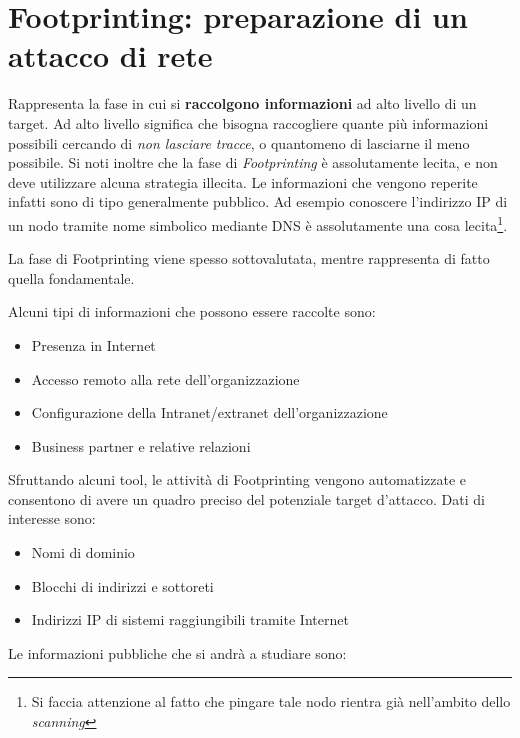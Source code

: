 \documentclass[14pt]{extreport}
\begin{document}
\chapter{Footprinting: preparazione di un attacco di rete}
Rappresenta la fase in cui si \textbf{raccolgono informazioni} ad alto livello di un target. Ad alto livello significa che bisogna raccogliere quante più informazioni possibili cercando di \textit{non lasciare tracce}, o quantomeno di lasciarne il meno possibile.
Si noti inoltre che la fase di \textit{Footprinting} è assolutamente lecita, e non deve utilizzare alcuna strategia illecita. Le informazioni che vengono reperite infatti sono di tipo generalmente pubblico. Ad esempio conoscere l'indirizzo IP di un nodo tramite nome simbolico mediante DNS è assolutamente una cosa lecita\footnote{Si faccia attenzione al fatto che pingare tale nodo rientra già nell'ambito dello \textit{scanning}}.

La fase di Footprinting viene spesso sottovalutata, mentre rappresenta di fatto quella fondamentale.

Alcuni tipi di informazioni che possono essere raccolte sono:

\begin{itemize}
    \item Presenza in Internet
    \item Accesso remoto alla rete dell'organizzazione
    \item Configurazione della Intranet/extranet dell'organizzazione
    \item Business partner e relative relazioni
\end{itemize}
Sfruttando alcuni tool, le attività di Footprinting vengono automatizzate e consentono di avere un quadro preciso del potenziale target d'attacco. Dati di interesse sono:

\begin{itemize}
    \item Nomi di dominio
    \item Blocchi di indirizzi e sottoreti
    \item Indirizzi IP di sistemi raggiungibili tramite Internet
\end{itemize}
Le informazioni pubbliche che si andrà a studiare sono:
\end{document}

